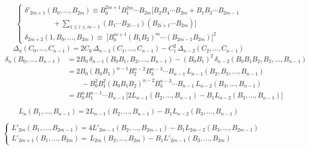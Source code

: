 \documentclass[11pt,a4paper]{article}
\begin{document}
\[
\begin{cases}
\delta'_{2m+1}(B_0, \ldots, B_{2m}) \equiv B_0^{2m+1} B_1^{2m} \cdots B_{2m}
\bigl[B_2 B_4 \cdots B_{2m} + B_1 B_3 \cdots B_{2m-1} \\
\qquad\qquad + \sum_{1 \leqslant i \leqslant m-1} (B_1 \cdots B_{2i-1})(B_{2i+1} \cdots B_{2m})\bigr] \\[1ex]
\delta_{2m+2}(1, B_0, \ldots, B_{2m}) \equiv \;
\bigl[B_0^{m+1} (B_1 B_2)^m \cdots (B_{2m-1} B_{2m})\bigr]^2
\end{cases}
\]
\[
\Delta_n(C_0, \ldots, C_{n-1}) = 2C_0\, \Delta_{n-1}(C_1, \ldots, C_{n-1})
- C_1^2\, \Delta_{n-2}(C_2, \ldots, C_{n-1})
\]
\[
\begin{aligned}
\delta_n(B_0, \ldots, B_{n-1}) &= 2B_0\, \delta_{n-1}(B_0B_1, B_2, \ldots, B_{n-1})
- (B_0B_1)^2\, \delta_{n-2}(B_0B_1B_2, B_3, \ldots, B_{n-1}) \\
&= 2B_0 (B_0B_1)^{n-1} B_2^{n-2} B_3^{n-3} \cdots B_{n-1}\,
L_{n-1}(B_2, B_3, \ldots, B_{n-1}) \\
&\qquad - B_0^2 B_1^2 (B_0B_1B_2)^{n-2} B_3^{n-3} \cdots B_{n-1}\,
L_{n-2}(B_3, \ldots, B_{n-1}) \\
&= B_0^n B_1^{n-1} \cdots B_{n-1}\,
\bigl[2L_{n-1}(B_2, \ldots, B_{n-1}) - B_1 L_{n-2}(B_3, \ldots, B_{n-1})\bigr]
\end{aligned}
\]

\[
\boxed{L_n(B_1, \ldots, B_{n-1}) = 2L_{n-1}(B_2, \ldots, B_{n-1})
- B_1 L_{n-2}(B_3, \ldots, B_{n-1})}
\]

\[
\begin{cases}
L'_{2m}(B_1, \ldots, B_{2m-1}) = 4L'_{2m-1}(B_2, \ldots, B_{2m-1})
- B_1 L_{2m-2}(B_3, \ldots, B_{2m-1}) \\
L'_{2m+1}(B_1, \ldots, B_{2m}) = \, L_{2m}(B_2, \ldots, B_{2m})
- B_1 L'_{2m-1}(B_3, \ldots, B_{2m})
\end{cases}
\]
\end{document}
